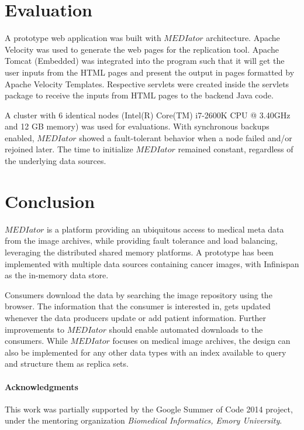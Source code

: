 \documentclass[conference]{IEEEtran}
\begin{document}
\section{Evaluation}
A prototype web application was built with $MEDIator$ architecture. Apache Velocity was used to generate the web pages for the replication tool. Apache Tomcat (Embedded) was integrated into the program such that it will get the user inputs from the HTML pages and present the output in pages formatted by Apache Velocity Templates. Respective servlets were created inside the servlets package to receive the inputs from HTML pages to the backend Java code.

A cluster with 6 identical nodes (Intel(R) Core(TM) i7-2600K CPU @ 3.40GHz and 12 GB memory) was used for evaluations. With synchronous backups enabled, $MEDIator$ showed a fault-tolerant behavior when a node failed and/or rejoined later. The time to initialize $MEDIator$ remained constant, regardless of the underlying data sources.


\section{Conclusion}
\balance

$MEDIator$ is a platform providing an ubiquitous access to medical meta data from the image archives, while providing fault tolerance and load balancing, leveraging the distributed shared memory platforms. A prototype has been implemented with multiple data sources containing cancer images, with Infinispan as the in-memory data store.

Consumers download the data by searching the image repository using the browser. The information that the consumer is interested in, gets updated whenever the data producers update or add patient information. Further improvements to $MEDIator$ should enable automated downloads to the consumers. While $MEDIator$ focuses on medical image archives, the design can also be implemented for any other data types with an index available to query and structure them as replica sets.


\small{ \paragraph*{\textbf{Acknowledgments}} This work was partially supported by the Google Summer of Code 2014 project, under the mentoring organization \textit{Biomedical Informatics, Emory University}.}
\end{document}

